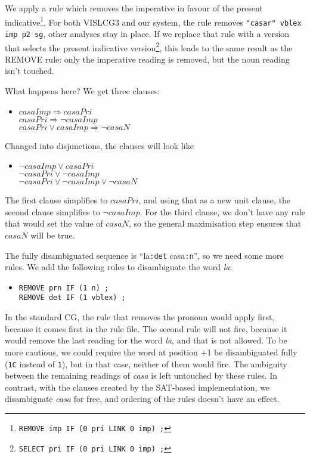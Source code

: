 \documentclass[11pt]{article}
\begin{document}
We apply a rule which removes the imperative in favour of the present indicative\footnote{\texttt{REMOVE imp IF (0 pri LINK 0 imp) ;}}.
For both VISLCG3 and our system, the rule removes \texttt{"casar" vblex imp p2 sg}, 
other analyses stay in place. If we replace that rule with a version that selects the present indicative 
version\footnote{\texttt{SELECT pri IF (0 pri LINK 0 imp) ;}}, this leads to the same result as the REMOVE rule: only the imperative reading is removed, but the noun reading isn't touched.


What happens here? We get three clauses:

\begin{itemize}
\item [] $casaImp \Rightarrow casaPri$ \\
            $casaPri \Rightarrow \neg casaImp$ \\
            $casaPri \vee casaImp \Rightarrow \neg casaN$
\end{itemize}

Changed into disjunctions, the clauses will look like
\begin{itemize}
\item [] $\neg casaImp \vee casaPri$ \\
            $\neg casaPri \vee \neg casaImp$ \\
            $\neg casaPri \vee \neg casaImp \vee \neg casaN$
\end{itemize}

The first clause simplifies to $casaPri$, and using that as a new unit clause, the second clause simplifies to $\neg casaImp$. 
For the third clause, we don't have any rule that would set the value of $casaN$, so the general maximisation step ensures that $casaN$ will be true. 

The fully disambiguated sequence is ``la\texttt{:det} casa\texttt{:n}'', so we need some more rules.
We add the following rules to disambiguate the word \emph{la}:
\begin{itemize}
\item [] \texttt{REMOVE prn IF (1 n) ;} \\
             \texttt{REMOVE det IF (1 vblex) ;}
\end{itemize}

In the standard CG, the rule that removes the pronoun would apply first, because it comes first in the rule file.
The second rule will not fire, because it would remove the last reading for the word \emph{la}, and that is not allowed. To be more cautious, we could require the word at position +1 be disambiguated fully (\texttt{1C} instead of \texttt{1}), but in that case, neither of them would fire. The ambiguity between the remaining readings of \emph{casa} is left untouched by these rules.
In contrast, with the clauses created by the SAT-based implementation, we disambiguate \emph{casa} for free, and ordering of the rules doesn't have an effect.
\end{document}
